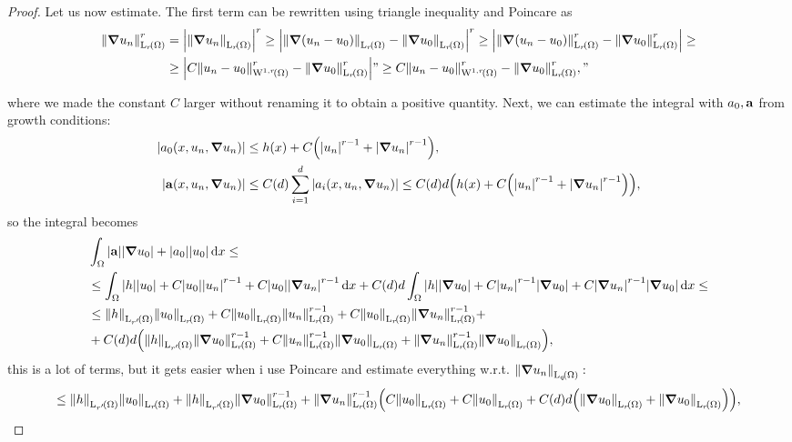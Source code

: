 \documentclass{article}
\begin{document}
\begin{proof}
	Let us now estimate. The first term can be rewritten using triangle inequality and Poincare as
	\begin{align*}
		\norm{\grad u_n}_{\LpSet[r]{\Omega}}^r &= \abs{\norm{\grad u_n}_{\LpSet[r]{\Omega}}}^r \geq \abs{\norm{\grad\qty(u_n - u_0)}_{\LpSet[r]{\Omega}} - \norm{\grad u_0}_{\LpSet[r]{\Omega}}}^r \geq \abs{\norm{\grad\qty(u_n - u_0)}_{\LpSet[r]{\Omega}}^r - \norm{ \grad u_0}_{\LpSet[r]{\Omega}}^r} \geq \\ 
		&\geq \abs{C \norm{u_n - u_0}_{\WkpSet[1][r]{\Omega}}^r - \norm{\grad u_0}_{\LpSet[r]{\Omega}}^r} "\geq C \norm{u_n - u_0}_{\WkpSet[1][r]{\Omega}}^r - \norm{\grad u_0}_{\LpSet[r]{\Omega}}^r,"
	\end{align*}

	where we made the constant $C$ larger without renaming it to obtain a positive quantity. Next, we can estimate the integral with $a_0, \vb{a}$ from growth conditions:
\begin{align*}
	\abs{a_0(x, u_n, \grad u_n)} &\leq h(x) + C\qty(\abs{u_n}^{r-1} + \abs{\grad u_n}^{r-1}), \\
	\abs{\vb{a}\qty(x, u_n, \grad u_n)}& \leq C(d) \sum_{i=1}^d \abs{a_i\qty(x, u_n, \grad u_n)} \leq C(d)d\qty(h(x) + C \qty(\abs{u_n}^{r-1}+ \abs{\grad u_n}^{r-1})),
\end{align*}
so the integral becomes
\begin{align*}
	&\int_{\Omega}\abs{\vb{a}}\abs{\grad u_0} + \abs{a_0}\abs{u_0}\dd{x}\leq \\
	&\leq \int_{\Omega}\abs{h} \abs{u_0} + C\abs{u_0} \abs{u_n}^{r-1} +C \abs{u_0} \abs{\grad u_n}^{r-1}\dd{x} + C(d) d \int_{\Omega}\abs{h}\abs{\grad u_0} + C\abs{u_n}^{r-1}\abs{\grad u_0} + C\abs{\grad u_n}^{r-1} \abs{\grad u_0}\dd{x} \leq \\
									    &\leq \norm{h}_{\LpSet[r']{\Omega}}\norm{u_0}_{\LpSet[r]{\Omega}} + C \norm{u_0}_{\LpSet[r]{\Omega}}\norm{u_n}_{\LpSet[r]{\Omega}}^{r-1} + C \norm{u_0}_{\LpSet[r]{\Omega}} \norm{\grad u_n}_{\LpSet[r]{\Omega}}^{r-1}+\\
									    &+ C(d)d\qty( \norm{h}_{\LpSet[r']{\Omega}} \norm{\grad u_0}_{\LpSet[r]{\Omega}}^{r-1} + C \norm{u_n}_{\LpSet[r]{\Omega}}^{r-1} \norm{\grad u_0}_{\LpSet[r]{\Omega}}+\norm{\grad u_n}_{\LpSet[r]{\Omega}}^{r-1} \norm{\grad u_0}_{\LpSet[r]{\Omega}}),
\end{align*}
this is a lot of terms, but it gets easier when i use Poincare and estimate everything w.r.t. $\norm{\grad u_n}_{\LpSet[q]{\Omega}}:$
\[
	\leq \norm{h}_{\LpSet[r']{\Omega}} \norm{u_0}_{\LpSet[r]{\Omega}} + \norm{h}_{\LpSet[r']{\Omega}}\norm{\grad u_0}_{\LpSet[r]{\Omega}}^{r-1}+ \norm{\grad u_n}_{\LpSet[r]{\Omega}}^{r-1}\qty(C \norm{u_0}_{\LpSet[r]{\Omega}}+ C \norm{u_0}_{\LpSet[r]{\Omega}}+ C\qty(d)d\qty(\norm{\grad u_0}_{\LpSet[r]{\Omega}} + \norm{\grad u_0}_{\LpSet[r]{\Omega}})),
\]
\end{proof}
\end{document}
